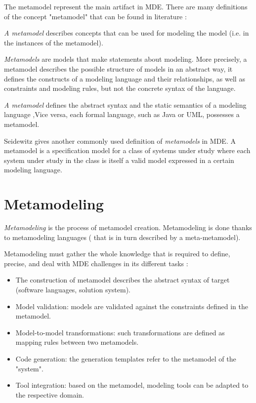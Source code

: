 The metamodel represent the main artifact in MDE. There are many definitions of the concept "metamodel" that can be found in literature \cite{stahl2006model}:

\textit{A metamodel} describes concepts that can be used for modeling the model (i.e. in the instances of the metamodel).

\textit {Metamodels} are models that make statements about modeling. More precisely, a metamodel describes the possible structure of models in an abstract way, it defines the constructs of a modeling language and their relationships, as well as constraints and modeling rules, but not the concrete syntax of the language.

\textit{A metamodel} defines the abstract syntax and the static semantics of a modeling language ,Vice versa, each formal language, such as Java or UML, possesses a metamodel.

Seidewitz \cite{seidewitz2003models} gives another commonly used definition of \textit{metamodels} in MDE. A metamodel is a specification model for a class of systems under study where each system under study in the class is itself a valid model expressed in a certain modeling language.

\section{Metamodeling}

\textit{Metamodeling} is the process of metamodel creation. Metamodeling is done thanks to metamodeling languages ( that is in turn described by a meta-metamodel).

Metamodeling must gather the whole  knowledge that is required to define, precise, and deal with MDE challenges in its different tasks \cite{wortmann2020modeling}:

\begin{itemize}
\item The construction of metamodel describes the abstract syntax of target (software languages, solution system).
\item Model validation: models are validated against the constraints defined in the metamodel. 
\item Model-to-model transformations: such transformations are defined as mapping rules between two metamodels.
\item Code generation: the generation templates refer to the metamodel of the "system". 
\item Tool integration: based on the metamodel, modeling tools can be adapted to the respective domain. 
\end{itemize}


